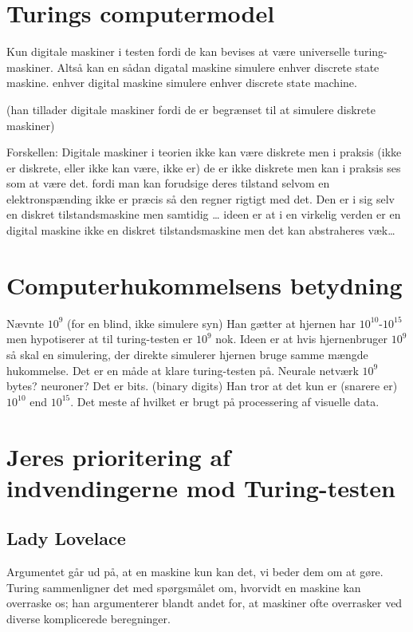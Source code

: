 \documentclass{article}
\author{Mikkel Kragh Mathiesen, Jannik Gram, Rune \& Rasmus Abrahams{\tt (son|en)}}
\title{}
\date{\today}
\begin{document}
\maketitle
\section{Turings computermodel}
Kun digitale maskiner i testen fordi de kan bevises at være universelle turing-maskiner.
Altså kan en sådan digatal maskine simulere enhver discrete state maskine.
enhver digital maskine simulere enhver discrete state machine.

(han tillader digitale maskiner fordi de er begrænset til at simulere diskrete maskiner)

Forskellen: Digitale maskiner i teorien ikke kan være diskrete men i praksis (ikke er diskrete, eller ikke kan være, ikke er) de er ikke diskrete men kan i praksis ses som at være det. fordi man kan forudsige deres tilstand selvom en elektronspænding ikke er præcis så den regner rigtigt med det.
Den er i sig selv en diskret tilstandsmaskine men samtidig … ideen er at i en virkelig verden er en digital maskine ikke en  diskret tilstandsmaskine men det kan abstraheres væk…

\section{Computerhukommelsens betydning}
Nævnte $10^9$ (for en blind, ikke simulere syn)
Han gætter at hjernen har $10^{10}$-$10^{15}$ men hypotiserer at til turing-testen er $10^9$ nok.
Ideen er at hvis hjernenbruger $10^9$ så skal en simulering, der direkte simulerer hjernen bruge samme mængde hukommelse. Det er en måde at klare turing-testen på.
Neurale netværk
$10^9$ bytes? neuroner? Det er bits. (binary digits)
Han tror at det kun er (snarere er) $10^{10}$ end $10^{15}$.
Det meste af hvilket er brugt på processering af visuelle data.

\section{Jeres prioritering af indvendingerne mod Turing-testen}
\subsection{Lady Lovelace}
Argumentet går ud på, at en maskine kun kan det, vi beder dem om at gøre. Turing sammenligner det med spørgsmålet om, hvorvidt en maskine kan overraske os; han argumenterer blandt andet for, at maskiner ofte overrasker ved diverse komplicerede beregninger.
\end{document}
